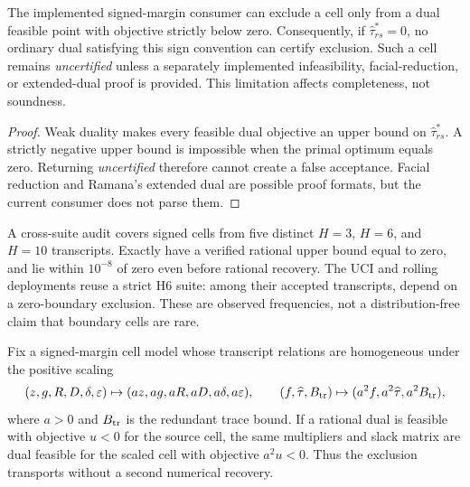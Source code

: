 \documentclass[smallextended]{svjour3}
\newcommand{\eps}{\varepsilon}
\begin{document}
\begin{proposition}
\label{prop:signed-boundary}
The implemented signed-margin consumer can exclude a cell only from a dual
feasible point with objective strictly below zero.  Consequently, if
$\widehat\tau_{rs}^*=0$, no ordinary dual satisfying this sign convention can
certify exclusion.  Such a cell remains \emph{uncertified} unless a separately
implemented infeasibility, facial-reduction, or extended-dual proof is
provided.  This limitation affects completeness, not soundness.
\end{proposition}

\begin{proof}
Weak duality makes every feasible dual objective an upper bound on
$\widehat\tau_{rs}^*$.  A strictly negative upper bound is impossible when the
primal optimum equals zero.  Returning \emph{uncertified} therefore cannot
create a false acceptance.  Facial reduction and Ramana's extended dual
\citep{BorweinWolkowicz1981,Ramana1997} are possible proof formats, but the
current consumer does not parse them.
\end{proof}

A cross-suite audit covers \SignedBoundaryCells{} signed cells from five
distinct $H=3$, $H=6$, and $H=10$ transcripts.  Exactly
\SignedBoundaryExactZero{} have a verified rational upper bound equal to zero,
and \SignedBoundaryFloatingNearZero{} lie within $10^{-8}$ of zero even before
rational recovery.  The UCI and rolling deployments reuse a strict H6 suite:
among their \SignedBoundaryWorkloadAccepted{} accepted transcripts,
\SignedBoundaryWorkloadZero{} depend on a zero-boundary exclusion.  These are
observed frequencies, not a distribution-free claim that boundary cells are
rare.

\begin{lemma}
\label{lem:homogeneous-transport}
Fix a signed-margin cell model whose transcript relations are homogeneous under
the positive scaling
\[
 (z,g,R,D,\delta,\eps)\mapsto
 (az,ag,aR,aD,a\delta,a\eps),\qquad
 (f,\widehat\tau,B_{\rm tr})\mapsto
 (a^2f,a^2\widehat\tau,a^2B_{\rm tr}),
\]
where $a>0$ and $B_{\rm tr}$ is the redundant trace bound.  If a rational dual
is feasible with objective $u<0$ for the source cell, the same multipliers and
slack matrix are dual feasible for the scaled cell with objective $a^2u<0$.
Thus the exclusion transports without a second numerical recovery.
\end{lemma}
\end{document}

